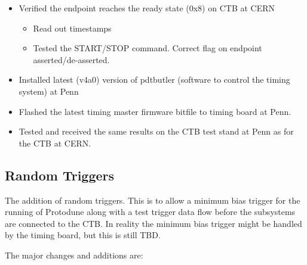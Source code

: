 \documentclass[]{report}
\begin{document}
	\begin{itemize}
		\item Verified the endpoint reaches the ready state (0x8) on CTB at CERN
			\begin{itemize}
				\item Read out timestamps
				\item Tested the START/STOP command. Correct flag on endpoint asserted/de-asserted.
			\end{itemize} 
	\end{itemize}
	
	\begin{itemize}
		\item Installed latest (v4a0) version of pdtbutler (software to control the timing system) at Penn
		\item Flashed the latest timing master firmware bitfile to timing board at Penn.
		\item Tested and received the same results on the CTB test stand at Penn as for the CTB at CERN.
	\end{itemize}

\subsection{Random Triggers}

The addition of random triggers. This is to allow a minimum bias trigger for the running of Protodune along with a test trigger data flow before the subsystems are connected to the CTB. In reality the minimum bias trigger might be handled by the timing board, but this is still TBD.

The major changes and additions are:
\end{document}
